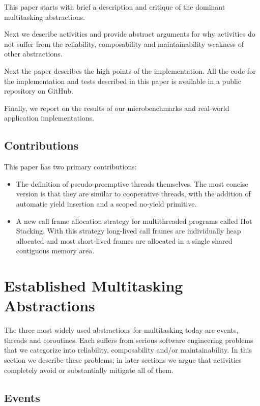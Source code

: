 \documentclass[10pt,preprint]{sigplanconf}
\begin{document}
This paper starts with brief a description and critique of the dominant multitasking abstractions.

Next we describe activities and provide abstract arguments for why activities do not suffer from the reliability, composability and maintainability weakness of other abstractions.

Next the paper describes the high points of the \charcoal{} implementation.
All the code for the implementation and tests described in this paper is available in a public repository on GitHub.

Finally, we report on the results of our microbenchmarks and real-world application implementations.

\subsection{Contributions}

This paper has two primary contributions:

\begin{itemize}
\item The definition of pseudo-preemptive threads themselves.
The most concise version is that they are similar to cooperative threads, with the addition of automatic yield insertion and a scoped no-yield primitive.
\item A new call frame allocation strategy for multithreaded programs called Hot Stacking.
With this strategy long-lived call frames are individually heap allocated and most short-lived frames are allocated in a single shared contiguous memory area.
\end{itemize}

\section{Established Multitasking Abstractions}

The three most widely used abstractions for multitasking today are events, threads and coroutines.
Each suffers from serious software engineering problems that we categorize into reliability, composability and/or maintainability.
In this section we describe these problems; in later sections we argue that activities completely avoid or substantially mitigate all of them.

\subsection{Events}
\end{document}
